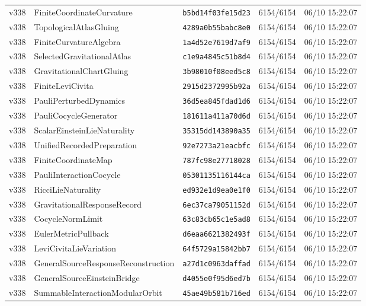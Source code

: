 \documentclass[11pt]{article}
\theoremstyle{definition}\newtheorem{deriv}{Derivation}
\begin{document}
{\begin{longtable}{@{}lllll@{}}
v338 & FiniteCoordinateCurvature & \texttt{b5bd14f03fe15d23} & 6154/6154 & 06/10 15:22:07 \\
v338 & TopologicalAtlasGluing & \texttt{4289a0b55babc8e0} & 6154/6154 & 06/10 15:22:07 \\
v338 & FiniteCurvatureAlgebra & \texttt{1a4d52e7619d7af9} & 6154/6154 & 06/10 15:22:07 \\
v338 & SelectedGravitationalAtlas & \texttt{c1e9a4845c51b8d4} & 6154/6154 & 06/10 15:22:07 \\
v338 & GravitationalChartGluing & \texttt{3b98010f08eed5c8} & 6154/6154 & 06/10 15:22:07 \\
v338 & FiniteLeviCivita & \texttt{2915d2372995b92a} & 6154/6154 & 06/10 15:22:07 \\
v338 & PauliPerturbedDynamics & \texttt{36d5ea845fdad1d6} & 6154/6154 & 06/10 15:22:07 \\
v338 & PauliCocycleGenerator & \texttt{181611a411a70d6d} & 6154/6154 & 06/10 15:22:07 \\
v338 & ScalarEinsteinLieNaturality & \texttt{35315dd143890a35} & 6154/6154 & 06/10 15:22:07 \\
v338 & UnifiedRecordedPreparation & \texttt{92e7273a21eacbfc} & 6154/6154 & 06/10 15:22:07 \\
v338 & FiniteCoordinateMap & \texttt{787fc98e27718028} & 6154/6154 & 06/10 15:22:07 \\
v338 & PauliInteractionCocycle & \texttt{05301135116144ca} & 6154/6154 & 06/10 15:22:07 \\
v338 & RicciLieNaturality & \texttt{ed932e1d9ea0e1f0} & 6154/6154 & 06/10 15:22:07 \\
v338 & GravitationalResponseRecord & \texttt{6ec37ca79051152d} & 6154/6154 & 06/10 15:22:07 \\
v338 & CocycleNormLimit & \texttt{63c83cb65c1e5ad8} & 6154/6154 & 06/10 15:22:07 \\
v338 & EulerMetricPullback & \texttt{d6eaa6621382493f} & 6154/6154 & 06/10 15:22:07 \\
v338 & LeviCivitaLieVariation & \texttt{64f5729a15842bb7} & 6154/6154 & 06/10 15:22:07 \\
v338 & GeneralSourceResponseReconstruction & \texttt{a27d1c0963daffad} & 6154/6154 & 06/10 15:22:07 \\
v338 & GeneralSourceEinsteinBridge & \texttt{d4055e0f95d6ed7b} & 6154/6154 & 06/10 15:22:07 \\
v338 & SummableInteractionModularOrbit & \texttt{45ae49b581b716ed} & 6154/6154 & 06/10 15:22:07 \\

\end{longtable}}
\end{document}
